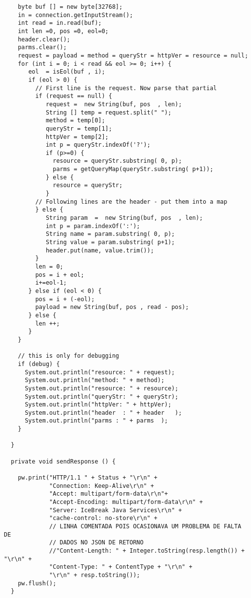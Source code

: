 \begin{lstlisting}
    byte buf [] = new byte[32768];
    in = connection.getInputStream();
    int read = in.read(buf);
    int len =0, pos =0, eol=0;
    header.clear();
    parms.clear();
    request = payload = method = queryStr = httpVer = resource = null;
    for (int i = 0; i < read && eol >= 0; i++) {
       eol  = isEol(buf , i);
       if (eol > 0) {
         // First line is the request. Now parse that partial
         if (request == null) {
            request =  new String(buf, pos  , len);
            String [] temp = request.split(" ");
            method = temp[0];
            queryStr = temp[1];
            httpVer = temp[2];
            int p = queryStr.indexOf('?');
            if (p>=0) {
              resource = queryStr.substring( 0, p);
              parms = getQueryMap(queryStr.substring( p+1));
            } else {
              resource = queryStr;
            }
         // Following lines are the header - put them into a map
         } else {
            String param  =  new String(buf, pos  , len);
            int p = param.indexOf(':');
            String name = param.substring( 0, p);
            String value = param.substring( p+1);
            header.put(name, value.trim());
         }
         len = 0;
         pos = i + eol;
         i+=eol-1;
       } else if (eol < 0) {
         pos = i + (-eol);
         payload = new String(buf, pos , read - pos);
       } else {
         len ++;
       }
    }

    // this is only for debugging
    if (debug) {
      System.out.println("resource: " + request);
      System.out.println("method: " + method);
      System.out.println("resource: " + resource);
      System.out.println("queryStr: " + queryStr);
      System.out.println("httpVer: " + httpVer);
      System.out.println("header  : " + header   );
      System.out.println("parms : " + parms  );
    }

  }

  private void sendResponse () {   
    
    pw.print("HTTP/1.1 " + Status + "\r\n" +
             "Connection: Keep-Alive\r\n" +
             "Accept: multipart/form-data\r\n"+
             "Accept-Encoding: multipart/form-data\r\n" +
             "Server: IceBreak Java Services\r\n" +
             "cache-control: no-store\r\n" +
             // LINHA COMENTADA POIS OCASIONAVA UM PROBLEMA DE FALTA DE 
             // DADOS NO JSON DE RETORNO
             //"Content-Length: " + Integer.toString(resp.length()) + "\r\n" +
             "Content-Type: " + ContentType + "\r\n" +
             "\r\n" + resp.toString());
    pw.flush();
  }


\end{lstlisting}
